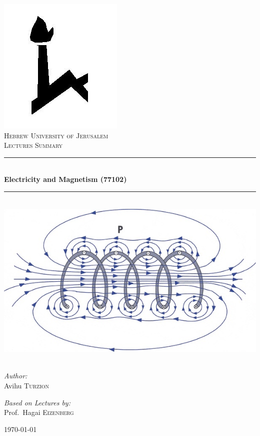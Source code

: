 \documentclass[]{book}
\newcommand{\HRule}{\rule{\linewidth}{0.5mm}}
\begin{document}
	\begin{titlepage}
	\begin{center}

	\includegraphics[scale=0.2]{huji} \\[2mm]
	\textsc{\LARGE Hebrew University of Jerusalem}\\[1.5cm]
	
	\textsc{\Large Lectures Summary}\\[0.5cm]
	
	\HRule \\[0.4cm]
	{ \huge \bfseries Electricity and Magnetism (77102)}\\[0.4cm]
	
	\HRule \\[1.5cm]
	
	\includegraphics[scale=0.5]{coil1}~\\[1cm]
	
	\begin{minipage}{0.4\textwidth}
	\begin{flushleft} \large
	\emph{Author:}\\
	Avihu \textsc{Turzion}
	\end{flushleft}
	\end{minipage}
	\begin{minipage}{0.4\textwidth}
	\begin{flushright} \large
	\emph{Based on Lectures by:} \\
	Prof.~Hagai \textsc{Eizenberg}
	\end{flushright}
	\end{minipage}
	
	\vfill
	
	{\large \today}
	
	\end{center}
	
	\end{titlepage}
	
\end{document}
